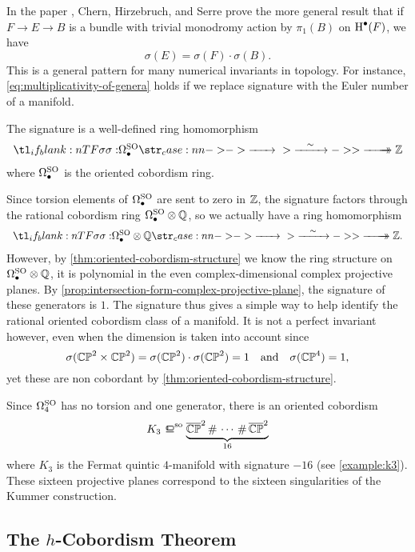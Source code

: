 \begin{remark*}
	In the paper \cite{chernhirzserre1957index}, Chern, Hirzebruch, and Serre prove the more general result that if $F \to E \to B$ is a bundle with trivial monodromy action by $\pi_1(B)$ on $\operatorname{H}^\bullet(F)$, we have
	\begin{equation}\label{eq:multiplicativity-of-genera}
		\sigma(E) = \sigma(F)\cdot \sigma(B).
	\end{equation}
	This is a general pattern for many numerical invariants in topology. For instance, \cref{eq:multiplicativity-of-genera} holds if we replace signature with the Euler number of a manifold.
\end{remark*}

\begin{corollary}
	The signature is a well-defined ring homomorphism
	\[
		\lkxfunc{\sigma}{\Omega^\SO_\bullet}{\Z}
	\]
	where $\Omega^{\mathrm{SO}}_\bullet$ is the oriented cobordism ring.
\end{corollary}

Since torsion elements of $\Omega^{\mathrm{SO}}_\bullet$ are sent to zero in $\mathbb{Z}$, the signature factors through the rational cobordism ring $\Omega^{\mathrm{SO}}_\bullet\otimes \mathbb{Q}$, so we actually have a ring homomorphism
\[
	\lkxfunc{\sigma}{\Omega^\SO_\bullet\otimes \Q}{\Z.}
\]
However, by \cref{thm:oriented-cobordism-structure} we know the ring structure on $\Omega^{\mathrm{SO}}_\bullet\otimes \mathbb{Q}$, it is polynomial in the even complex-dimensional complex projective planes. By \cref{prop:intersection-form-complex-projective-plane}, the signature of these generators is $1$. The signature thus gives a simple way to help identify the rational oriented cobordism class of a manifold. It is not a perfect invariant however, even when the dimension is taken into account since
\[
		\sigma(\mathbb{CP}^2\times\mathbb{CP}^2) = \sigma(\mathbb{CP}^2)\cdot \sigma(\mathbb{CP}^2)= 1\quad\textrm{and}\quad \sigma(\mathbb{CP}^4)=1,
\]
yet these are non cobordant by \cref{thm:oriented-cobordism-structure}.

\begin{example}
	Since $\Omega^{\mathrm{SO}}_4$ has no torsion and one generator, there is an oriented cobordism
	\[
		K_3 \sobord \underbrace{\overline{\CP}^2\+\cdots\+\overline{\CP}^2}_{16}
	\]
	where $K_3$ is the Fermat quintic $4$-manifold with signature $-16$ (see \cref{example:k3}). These sixteen projective planes correspond to the sixteen singularities of the Kummer construction.
\end{example}

\subsection{The $h$-Cobordism Theorem}

